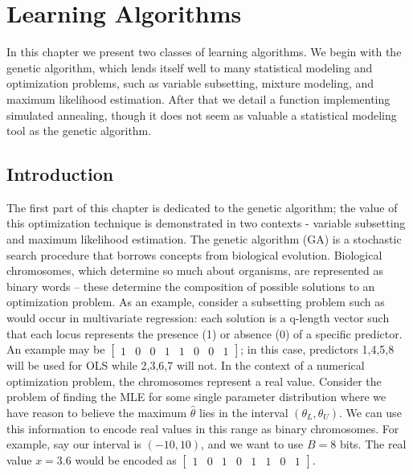 \documentclass{book}
\begin{document}
\setcounter{chapter}{8}

\chapter{Learning Algorithms}


In this chapter we present two classes of learning algorithms.
We begin with the genetic algorithm, which lends itself well to
many statistical modeling and optimization problems, such as
variable subsetting, mixture modeling, and maximum likelihood
estimation. After that we detail a function implementing
simulated annealing, though it does not seem as valuable a
statistical modeling tool as the genetic algorithm.

\section{Introduction}

The first part of this chapter is dedicated to the genetic algorithm; the
value of this optimization technique is demonstrated in two contexts -
variable subsetting and maximum likelihood estimation. The genetic algorithm
(GA) is a stochastic search procedure that borrows concepts from biological
evolution. Biological chromosomes, which determine so much about organisms,
are represented as binary words -- these determine the composition of
possible solutions to an optimization problem. As an example, consider a
subsetting problem such as would occur in multivariate regression: each
solution is a q-length vector such that each locus represents the presence
(1) or absence (0) of a specific predictor. An example may be $%
\begin{bmatrix}
1 & 0 & 0 & 1 & 1 & 0 & 0 & 1%
\end{bmatrix}%
$; in this case, predictors 1,4,5,8 will be used for OLS while 2,3,6,7 will
not. In the context of a numerical optimization problem, the chromosomes
represent a real value. Consider the problem of finding the MLE for some
single parameter distribution where we have reason to believe the maximum $%
\hat{\theta}$ lies in the interval $\left( \theta _{L},\theta
_{U}\right) $. We can use this information to encode real
values in this range as binary chromosomes. For example, say
our interval is $\left( -10,10\right) $, and
we want to use $B=8$ bits. The real value $x=3.6$ would be encoded as $%
\begin{bmatrix}
1 & 0 & 1 & 0 & 1 & 1 & 0 & 1%
\end{bmatrix}%
$.
\end{document}
